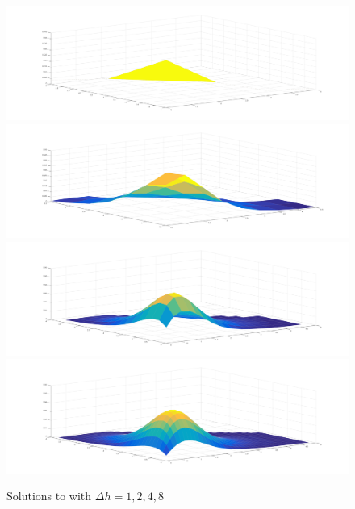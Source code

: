 \documentclass[10pt,a4paper]{article}
\begin{document}
\begin{figure}[H]
\includegraphics[width=\linewidth]{figures/gaussian-h1.png}
\includegraphics[width=\linewidth]{figures/gaussian-h2.png}
\includegraphics[width=\linewidth]{figures/gaussian-h4.png}
\includegraphics[width=\linewidth]{figures/gaussian-h8.png}
\caption{Solutions to  with $\Delta h = 1, 2, 4, 8$}
\label{fig: steps}
\end{figure}
\end{document}
